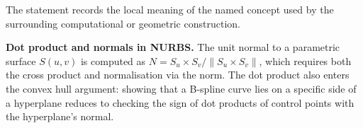 \begin{remark*}[Interpretation]
The statement records the local meaning of the named concept used by the
surrounding computational or geometric construction.
\end{remark*}

\DefinitionalRoot

\begin{remark*}[Exposition]
\textbf{Dot product and normals in NURBS.}
The unit normal to a parametric surface $S(u,v)$ is computed as
$N = S_u \times S_v / \|S_u \times S_v\|$, which requires both the
cross product and normalisation via the norm.
The dot product also enters the convex hull argument: showing that a
B-spline curve lies on a specific side of a hyperplane reduces to
checking the sign of dot products of control points with the hyperplane's normal.
\end{remark*}
